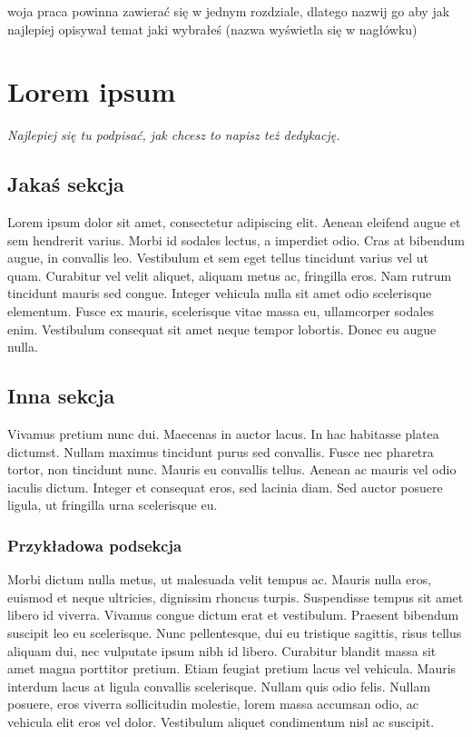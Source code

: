 \renewcommand{\autor}{Jan Kowalski}
woja praca powinna zawierać się w jednym rozdziale, dlatego nazwij go aby jak najlepiej opisywał temat jaki wybrałeś (nazwa wyświetla się w nagłówku)
\chapter{Lorem ipsum}
\textit{Najlepiej się tu podpisać, jak chcesz to napisz też dedykację.}
\section{Jakaś sekcja}
Lorem ipsum dolor sit amet, consectetur adipiscing elit. Aenean eleifend augue et sem hendrerit varius. Morbi id sodales lectus, a imperdiet odio. Cras at bibendum augue, in convallis leo. Vestibulum et sem eget tellus tincidunt varius vel ut quam. Curabitur vel velit aliquet, aliquam metus ac, fringilla eros. Nam rutrum tincidunt mauris sed congue. Integer vehicula nulla sit amet odio scelerisque elementum. Fusce ex mauris, scelerisque vitae massa eu, ullamcorper sodales enim. Vestibulum consequat sit amet neque tempor lobortis. Donec eu augue nulla.
\section{Inna sekcja}
Vivamus pretium nunc dui. Maecenas in auctor lacus. In hac habitasse platea dictumst. Nullam maximus tincidunt purus sed convallis. Fusce nec pharetra tortor, non tincidunt nunc. Mauris eu convallis tellus. Aenean ac mauris vel odio iaculis dictum. Integer et consequat eros, sed lacinia diam. Sed auctor posuere ligula, ut fringilla urna scelerisque eu.
\subsection{Przykładowa podsekcja}
Morbi dictum nulla metus, ut malesuada velit tempus ac. Mauris nulla eros, euismod et neque ultricies, dignissim rhoncus turpis. Suspendisse tempus sit amet libero id viverra. Vivamus congue dictum erat et vestibulum. Praesent bibendum suscipit leo eu scelerisque. Nunc pellentesque, dui eu tristique sagittis, risus tellus aliquam dui, nec vulputate ipsum nibh id libero. Curabitur blandit massa sit amet magna porttitor pretium. Etiam feugiat pretium lacus vel vehicula. Mauris interdum lacus at ligula convallis scelerisque. Nullam quis odio felis. Nullam posuere, eros viverra sollicitudin molestie, lorem massa accumsan odio, ac vehicula elit eros vel dolor. Vestibulum aliquet condimentum nisl ac suscipit.
